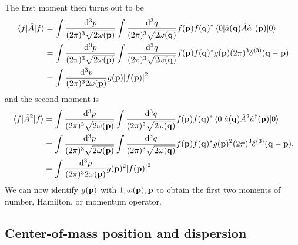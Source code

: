 The first moment then turns out to be
\begin{equation}
	\begin{split}
		\expval{\hat{A}}{f}
		&=
		\int\frac{\dd[3]{p}}{(2\pi)^3\sqrt{2\omega(\vb{p})}}
		\int\frac{\dd[3]{q}}{(2\pi)^3\sqrt{2\omega(\vb{q})}}
		f(\vb{p})f(\vb{q})^*
		\expval{\hat{a}(\vb{q})\hat{A}\hat{a}^\dagger(\vb{p})}{0}
		\\
		&=
		\int\frac{\dd[3]{p}}{(2\pi)^3\sqrt{2\omega(\vb{p})}}
		\int\frac{\dd[3]{q}}{(2\pi)^3\sqrt{2\omega(\vb{q})}}
		f(\vb{p})f(\vb{q})^*
		g(\vb{p})
		(2\pi)^3\delta^{(3)}(\vb{q}-\vb{p})
		\\
		&=
		\int\frac{\dd[3]{p}}{(2\pi)^32\omega(\vb{p})}
		g(\vb{p})
		\abs{f(\vb{p})}^2
	\end{split}
\end{equation}
and the second moment is
\begin{equation}
	\begin{split}
		\expval{\hat{A}^2}{f}
		&=
		\int\frac{\dd[3]{p}}{(2\pi)^3\sqrt{2\omega(\vb{p})}}
		\int\frac{\dd[3]{q}}{(2\pi)^3\sqrt{2\omega(\vb{q})}}
		f(\vb{p})f(\vb{q})^*
		\expval{\hat{a}(\vb{q})\hat{A}^2\hat{a}^\dagger(\vb{p})}{0}
		\\
		&=
		\int\frac{\dd[3]{p}}{(2\pi)^3\sqrt{2\omega(\vb{p})}}
		\int\frac{\dd[3]{q}}{(2\pi)^3\sqrt{2\omega(\vb{q})}}
		f(\vb{p})f(\vb{q})^*
		g(\vb{p})^2
		(2\pi)^3\delta^{(3)}(\vb{q}-\vb{p})
		\\
		&=
		\int\frac{\dd[3]{p}}{(2\pi)^32\omega(\vb{p})}
		g(\vb{p})^2
		\abs{f(\vb{p})}^2
	\end{split}
	.
\end{equation}
We can now identify $g(\vb{p})$ with $1,\omega(\vb{p}),\vb{p}$ to obtain the first two moments of number, Hamilton, or momentum operator.

\subsection{Center-of-mass position and dispersion}

